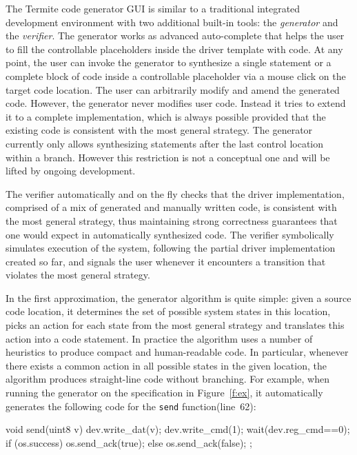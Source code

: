 \documentclass{book}
\newcommand{\termite}{Termite\xspace}
\theoremstyle{definition}
\newcommand{\src}[1]{\texttt{\small #1}}
\begin{document}
The \termite code generator GUI is similar to a traditional integrated development environment with two additional built-in tools: the \emph{generator} and the \emph{verifier}.  The generator works as advanced auto-complete that helps the user to fill the controllable placeholders inside the driver template with code.  At any point, the user can invoke the generator to synthesize a single statement or a complete block of code inside a controllable placeholder via a mouse click on the target code location.  The user can arbitrarily modify and amend the generated code.  However, the generator never modifies user code.  Instead it tries to extend it to a complete implementation, which is always possible provided that the existing code is consistent with the most general strategy.  The generator currently only allows synthesizing statements after the last control location within a branch.  However this restriction is not a conceptual one and will be lifted by ongoing development.

The verifier automatically and on the fly checks that the driver implementation, comprised of a mix of generated and manually written code, is consistent with the most general strategy, thus maintaining strong correctness guarantees that one would expect in automatically synthesized code.  The verifier symbolically simulates execution of the system, following the partial driver implementation created so far, and signals the user whenever it encounters a transition that violates the most general strategy.

In the first approximation, the generator algorithm is quite simple: given a source code location, it determines the set of possible system states in this location, picks an action for each state from the most general strategy and translates this action into a code statement.  In practice the algorithm uses a number of heuristics to produce compact and human-readable code.  In particular, whenever there exists a common action in all possible states in the given location, the algorithm produces straight-line code without branching.  For example, when running the generator on the specification in Figure~\ref{f:ex}, it automatically generates the following code for the \src{send} function(line~62):

\begin{tsllisting}[keywords=, frame=single]
void send(uint8 v){
    dev.write_dat(v);
    dev.write_cmd(1);
    wait(dev.reg_cmd==0);
    if (os.success) {
        os.send_ack(true);
    } else {
        os.send_ack(false);
    };}
\end{tsllisting}
\end{document}

